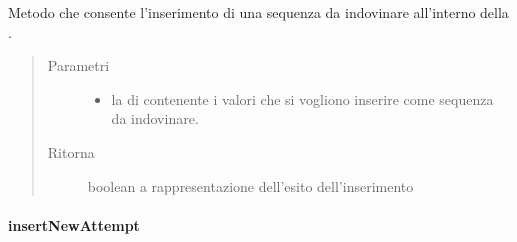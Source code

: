 \documentclass[letterpaper,10pt,italian,openany,oneside]{sphinxmanual}
\begin{document}
\begin{fulllineitems}
\label{\detokenize{source/it/unicam/cs/pa/mastermind/gamecore/BoardController:it.unicam.cs.pa.mastermind.gamecore.BoardController.insertCodeToGuess(List)}}
Metodo che consente l’inserimento di una sequenza da indovinare all’interno della .
\begin{quote}\begin{description}
\item[{Parametri}] \leavevmode\begin{itemize}
\item {} 
 \textendash{} la  di  contenente i valori che si vogliono inserire come sequenza da indovinare.

\end{itemize}

\item[{Ritorna}] \leavevmode
boolean a rappresentazione dell’esito dell’inserimento

\end{description}\end{quote}

\end{fulllineitems}



\paragraph{insertNewAttempt}
\label{\detokenize{source/it/unicam/cs/pa/mastermind/gamecore/BoardController:insertnewattempt}}
\end{document}
